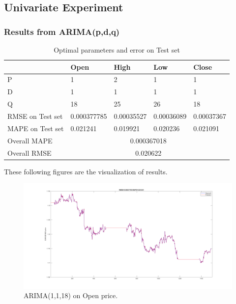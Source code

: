 \documentclass[11pt]{article}
\begin{document}
\subsection{Univariate Experiment}
\subsubsection{Results from ARIMA(p,d,q)}

\begin{table}[H]
  \centering
\begin{tabular}{|l|l|l|l|l|}
  \hline
  & Open        & High       & Low        & Close      \\ \hline
  P                & 1           & 2          & 1          & 1          \\ \hline
  D                & 1           & 1          & 1          & 1          \\ \hline
  Q                & 18          & 25         & 26         & 18         \\ \hline
  RMSE on Test set & 0.000377785 & 0.00035527 & 0.00036089 & 0.00037367 \\ \hline
  MAPE on Test set & 0.021241    & 0.019921   & 0.020236   & 0.021091   \\ \hline
  Overall MAPE     & \multicolumn{4}{c|}{0.000367018}                   \\ \hline
  Overall RMSE     & \multicolumn{4}{c|}{0.020622}                      \\ \hline
\end{tabular}
\caption{Optimal parameters and error on Test set}
\end{table}
These following figures are the visualization of results.
\begin{figure}[H]
  \centering
  \includegraphics[width=\textwidth,keepaspectratio]{figs/arima_1_1_18_open.png}
  \caption{ARIMA(1,1,18) on Open price.}
\end{figure}
\end{document}

